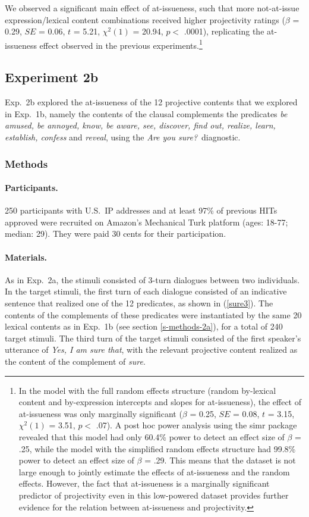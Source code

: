 \documentclass[11pt,fleqn]{article}
\newcommand{\6}{\mbox{$[\hspace*{-.6mm}[$}}
\newcommand{\9}{\mbox{$]\hspace*{-.6mm}]$}}
\begin{document}
We observed a significant main effect of at-issueness, such that more not-at-issue expression/lexical content combinations received higher projectivity ratings ($\beta$ = 0.29, $SE$ = 0.06, $t$ = 5.21, $\chi^2(1)$ = 20.94, $p <$ .0001), replicating the at-issueness effect observed in the previous experiments.\footnote{In the model with the full random effects structure (random by-lexical content and by-expression intercepts and slopes for at-issueness), the effect of at-issueness was only marginally significant ($\beta$ = 0.25, $SE$ = 0.08, $t$ = 3.15, $\chi^2(1)$ = 3.51, $p <$ .07).  A post hoc power analysis using the simr package \citep{simr} revealed that this model had only 60.4\% power to detect an effect size of $\beta$ = .25, while the model with the simplified random effects structure had 99.8\% power to detect an effect size of $\beta$ = .29. This means that the dataset is not large enough to jointly estimate the effects of at-issueness and the random effects. However, the fact that at-issueness is a marginally significant predictor of projectivity even in this low-powered dataset provides further evidence for the relation between at-issueness and projectivity.}

\subsection{Experiment 2b}\label{s-exp2b}

Exp.~2b explored the at-issueness of the 12 projective contents that we explored in Exp.~1b, namely the contents of the clausal complements the predicates {\em be amused, be annoyed, know, be aware, see, discover, find out, realize, learn, establish, confess} and {\em reveal}, using the {\em Are you sure?}~diagnostic.

\subsubsection{Methods}

\paragraph{Participants.} 250 participants with U.S.\ IP addresses and at least 97\% of previous HITs approved were recruited on Amazon's Mechanical Turk platform (ages: 18-77; median: 29). They were paid 30 cents for their participation.

\paragraph{Materials.} As in Exp.~2a, the stimuli consisted of 3-turn dialogues between two individuals. In the target stimuli, the first turn of each dialogue consisted of an indicative sentence that realized one of the 12 predicates, as shown in (\ref{sure3}). The contents of the complements of these predicates were instantiated by the same 20 lexical contents as in Exp.~1b (see section \ref{s-methods-2a}), for a total of 240 target stimuli. The third turn of the target stimuli consisted of the first speaker's utterance of {\em Yes, I am sure that}, with the relevant projective content realized as the content of the complement of {\em sure}. 
\end{document}
